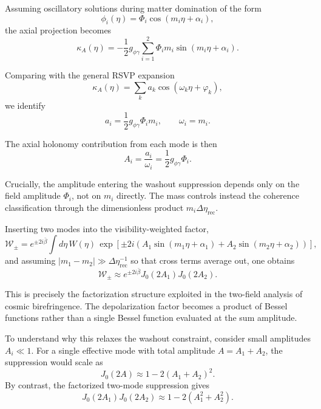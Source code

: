 \documentclass[12pt]{article}
\begin{document}
Assuming oscillatory solutions during matter domination of the form
\begin{equation}
\phi_i(\eta)
=
\Phi_i \cos(m_i \eta + \alpha_i),
\end{equation}
the axial projection becomes
\begin{equation}
\kappa_A(\eta)
=
-
\frac{1}{2} g_{\phi\gamma}
\sum_{i=1}^2
\Phi_i m_i
\sin(m_i \eta + \alpha_i).
\end{equation}

Comparing with the general RSVP expansion
\begin{equation}
\kappa_A(\eta)
=
\sum_k a_k \cos(\omega_k \eta + \varphi_k),
\end{equation}
we identify
\begin{equation}
a_i
=
\frac{1}{2} g_{\phi\gamma} \Phi_i m_i,
\qquad
\omega_i = m_i.
\end{equation}

The axial holonomy contribution from each mode is then
\begin{equation}
A_i
=
\frac{a_i}{\omega_i}
=
\frac{1}{2} g_{\phi\gamma} \Phi_i.
\end{equation}

Crucially, the amplitude entering the washout suppression depends only on the field amplitude $\Phi_i$, not on $m_i$ directly. The mass controls instead the coherence classification through the dimensionless product $m_i \Delta\eta_{\mathrm{rec}}$.

Inserting two modes into the visibility-weighted factor,
\begin{equation}
\mathcal{W}_\pm
=
e^{\pm 2 i \bar{\beta}}
\int d\eta \,
W(\eta)
\,
\exp
\left[
\pm 2 i
\left(
A_1 \sin(m_1 \eta + \alpha_1)
+
A_2 \sin(m_2 \eta + \alpha_2)
\right)
\right],
\end{equation}
and assuming $|m_1 - m_2| \gg \Delta\eta_{\mathrm{rec}}^{-1}$ so that cross terms average out, one obtains
\begin{equation}
\mathcal{W}_\pm
\approx
e^{\pm 2 i \bar{\beta}}
J_0(2 A_1)
J_0(2 A_2).
\end{equation}

This is precisely the factorization structure exploited in the two-field analysis of cosmic birefringence. The depolarization factor becomes a product of Bessel functions rather than a single Bessel function evaluated at the sum amplitude.

To understand why this relaxes the washout constraint, consider small amplitudes $A_i \ll 1$. For a single effective mode with total amplitude $A = A_1 + A_2$, the suppression would scale as
\begin{equation}
J_0(2A)
\approx
1 - 2(A_1 + A_2)^2.
\end{equation}
By contrast, the factorized two-mode suppression gives
\begin{equation}
J_0(2A_1)J_0(2A_2)
\approx
1 - 2(A_1^2 + A_2^2).
\end{equation}
\end{document}
